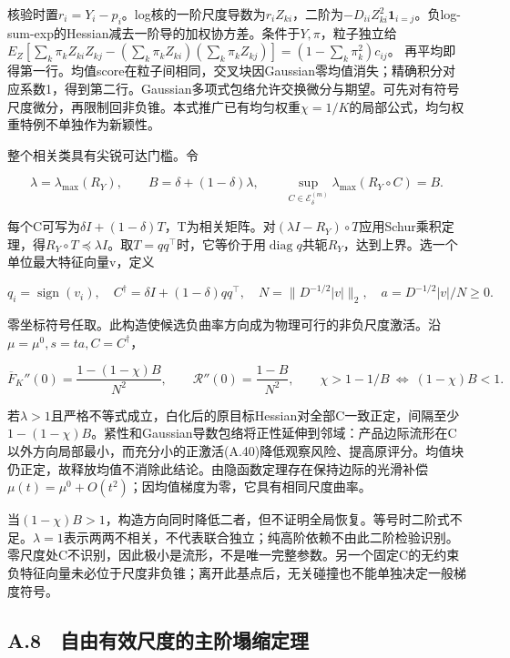 \documentclass[11pt,a4paper]{article}
\begin{document}
核验时置\(r_i=Y_i-p_i\)。log核的一阶尺度导数为\(r_iZ_{ki}\)，二阶为\(-D_{ii}Z_{ki}^2\mathbf1_{i=j}\)。负log-sum-exp的Hessian减去一阶导的加权协方差。条件于\(Y,\pi\)，粒子独立给
\(E_Z[\sum_k\pi_kZ_{ki}Z_{kj}-(\sum_k\pi_kZ_{ki})(\sum_k\pi_kZ_{kj})]=(1-\sum_k\pi_k^2)c_{ij}\)。
再平均即得第一行。均值score在粒子间相同，交叉块因Gaussian零均值消失；精确积分对应系数1，得到第二行。Gaussian多项式包络允许交换微分与期望。可先对有符号尺度微分，再限制回非负锥。本式推广已有均匀权重\(\chi=1/K\)的局部公式，均匀权重特例不单独作为新颖性。

整个相关类具有尖锐可达门槛。令

\[
\lambda=\lambda_{\max}(R_Y),\qquad B=\delta+(1-\delta)\lambda,
\qquad \sup_{C\in\mathcal E_\delta^{(m)}}\lambda_{\max}(R_Y\circ C)=B.
\tag{A.39}
\]

每个C可写为\(\delta I+(1-\delta)T\)，T为相关矩阵。对\((\lambda I-R_Y)\circ T\)应用Schur乘积定理，得\(R_Y\circ T\preceq\lambda I\)。取\(T=qq^\top\)时，它等价于用\(\operatorname{diag}q\)共轭\(R_Y\)，达到上界。选一个单位最大特征向量v，定义

\[
q_i=\operatorname{sign}(v_i),\quad
C^\dagger=\delta I+(1-\delta)qq^\top,\quad
N=\|D^{-1/2}|v|\|_2,\quad a=D^{-1/2}|v|/N\ge0.
\tag{A.40}
\]

零坐标符号任取。此构造使候选负曲率方向成为物理可行的非负尺度激活。沿\(\mu=\mu^0,s=ta,C=C^\dagger\)，

\[
\overline F_K''(0)=\frac{1-(1-\chi)B}{N^2},\qquad
\mathcal R''(0)=\frac{1-B}{N^2},\qquad
\chi>1-1/B\ \Longleftrightarrow\ (1-\chi)B<1.
\tag{A.41}
\]

若\(\lambda>1\)且严格不等式成立，白化后的原目标Hessian对全部C一致正定，间隔至少\(1-(1-\chi)B\)。紧性和Gaussian导数包络将正性延伸到邻域：产品边际流形在C以外方向局部最小，而充分小的正激活(A.40)降低观察风险、提高原评分。均值块仍正定，故释放均值不消除此结论。由隐函数定理存在保持边际的光滑补偿\(\mu(t)=\mu^0+O(t^2)\)；因均值梯度为零，它具有相同尺度曲率。

当\((1-\chi)B>1\)，构造方向同时降低二者，但不证明全局恢复。等号时二阶式不足。\(\lambda=1\)表示两两不相关，不代表联合独立；纯高阶依赖不由此二阶检验识别。零尺度处C不识别，因此极小是流形，不是唯一完整参数。另一个固定C的无约束负特征向量未必位于尺度非负锥；离开此基点后，无关碰撞也不能单独决定一般梯度符号。

\subsection*{A.8　自由有效尺度的主阶塌缩定理}\label{a.8-ux81eaux7531ux6709ux6548ux5c3aux5ea6ux7684ux4e3bux9636ux584cux7f29ux5b9aux7406}
\end{document}
